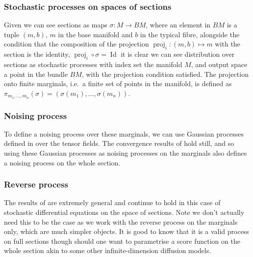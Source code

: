\subsubsection{Stochastic processes on spaces of sections}
Given we can see sections as maps \(\sigma: M \to BM\), where an element in \(BM\) is a tuple \((m, b)\), \(m\) in the base manifold and \(b\) in the typical fibre, alongside the condition that the composition of the projection \(\operatorname{proj}_i: (m, b)\mapsto m\) with the section is the identity, \(\operatorname{proj}_i \circ \sigma = \operatorname{Id}\) it is clear we can see distribution over sections as stochastic processes with index set the manifold \(M\), and output space a point in the bundle \(BM\), with the projection condition satisfied.
The projection onto finite marginals, i.e.\ a finite set of points in the manifold, is defined as $\pi_{m_1, .
		.., m_n}(\sigma) = (\sigma(m_1), ..., \sigma(m_n))$.

\subsubsection{Noising process}
To define a noising process over these marginals, we can use Gaussian processes defined in \textcite{hutchinson2021vector} over the tensor fields.
The convergence results of \textcite{phillips2022spectral} hold still, and so using these Gaussian processes as noising processes on the marginals also defines a noising process on the whole section.

\subsubsection{Reverse process}
The results of \textcite{cattiaux2021time} are extremely general and continue to hold in this case of stochastic differential equations on the space of sections.
Note we don't actually need this to be the case as we work with the reverse process on the marginals only, which are much simpler objects.
It is good to know that it is a valid process on full sections though should one want to parametrise a score function on the whole section akin to some other infinite-dimension diffusion models.


